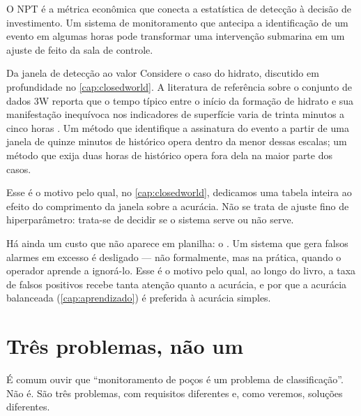 O NPT é a métrica econômica que conecta a estatística de detecção à decisão de
investimento. Um sistema de monitoramento que antecipa a identificação de um evento em
algumas horas pode transformar uma intervenção submarina em um ajuste de 
feito da sala de controle.

\begin{exemplo}{Da janela de detecção ao valor}
Considere o caso do hidrato, discutido em profundidade no \cref{cap:closedworld}.
A literatura de referência sobre o conjunto de dados 3W reporta que o tempo típico
entre o início da formação de hidrato e sua manifestação inequívoca nos indicadores de
superfície varia de trinta minutos a cinco horas \citep{VARGAS2019}. Um método que
identifique a assinatura do evento a partir de uma janela de quinze minutos de
histórico opera dentro da menor dessas escalas; um método que exija duas horas de
histórico opera fora dela na maior parte dos casos.

Esse é o motivo pelo qual, no \cref{cap:closedworld}, dedicamos uma tabela inteira ao
efeito do comprimento da janela sobre a acurácia. Não se trata de ajuste fino de
hiperparâmetro: trata-se de decidir se o sistema serve ou não serve.
\end{exemplo}

Há ainda um custo que não aparece em planilha: o . Um sistema que gera falsos alarmes em excesso é desligado --- não
formalmente, mas na prática, quando o operador aprende a ignorá-lo. Esse é o motivo
pelo qual, ao longo do livro, a taxa de falsos positivos recebe tanta atenção quanto a
acurácia, e por que a acurácia balanceada (\cref{cap:aprendizado}) é preferida à
acurácia simples.

\section{Três problemas, não um}
\label{sec:introducao-tresproblemas}

É comum ouvir que ``monitoramento de poços é um problema de classificação''. Não é.
São três problemas, com requisitos diferentes e, como veremos, soluções diferentes.

